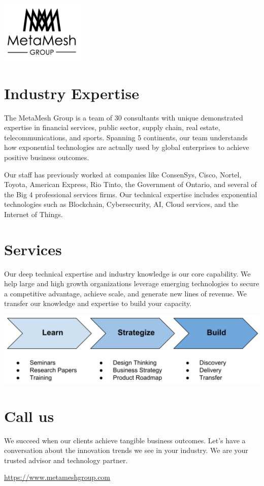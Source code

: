\documentclass[11pt,letterpaper,sans]{moderncv}        %
\begin{document}
\begin{center}
	\includegraphics[width=4cm]{../pics/logo1}
\end{center}
\maketitle
\recomputeletterlengths
\vspace{-1em}
\section{Industry Expertise}
The MetaMesh Group is a team of 30 consultants with unique demonstrated expertise in financial services, public sector, supply chain, real estate, telecommunications, and sports. Spanning 5 continents, our team understands how exponential technologies are actually used by global enterprises to achieve positive business outcomes. 

Our staff has previously worked at companies like ConsenSys, Cisco, Nortel, Toyota, American Express, Rio Tinto, the Government of Ontario, and several of the Big 4 professional services firms. Our technical expertise includes exponential technologies such as Blockchain, Cybersecurity, AI, Cloud services, and the Internet of Things.

\section{Services}
Our deep technical expertise and industry knowledge is our core capability. We help large and high growth organizations leverage emerging technologies to secure a competitive advantage, achieve scale, and generate new lines of revenue. We transfer our knowledge and expertise to build your capacity.

\begin{center}
	\includegraphics[width=14cm]{../pics/3-services}
\end{center}


\section{Call us}
We succeed when our clients achieve tangible business outcomes. Let’s have a conversation about the innovation trends we see in your industry. We are your trusted advisor and technology partner.

\vspace{1em}
\centering
\url{https://www.metameshgroup.com}
\end{document}
